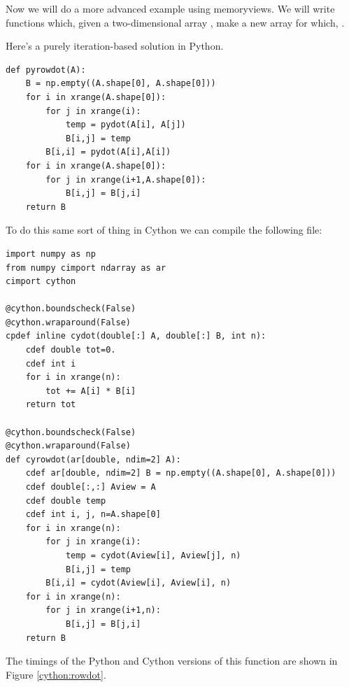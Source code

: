 Now we will do a more advanced example using memoryviews.
We will write functions which, given a two-dimensional array , make a new array  for which, .

Here's a purely iteration-based solution in Python.
\begin{lstlisting}
def pyrowdot(A):
    B = np.empty((A.shape[0], A.shape[0]))
    for i in xrange(A.shape[0]):
        for j in xrange(i):
            temp = pydot(A[i], A[j])
            B[i,j] = temp
        B[i,i] = pydot(A[i],A[i])
    for i in xrange(A.shape[0]):
        for j in xrange(i+1,A.shape[0]):
            B[i,j] = B[j,i]
    return B
\end{lstlisting}

To do this same sort of thing in Cython we can compile the following file:

\begin{lstlisting}
import numpy as np
from numpy cimport ndarray as ar
cimport cython

@cython.boundscheck(False)
@cython.wraparound(False)
cpdef inline cydot(double[:] A, double[:] B, int n):
    cdef double tot=0.
    cdef int i
    for i in xrange(n):
        tot += A[i] * B[i]
    return tot

@cython.boundscheck(False)
@cython.wraparound(False)
def cyrowdot(ar[double, ndim=2] A):
    cdef ar[double, ndim=2] B = np.empty((A.shape[0], A.shape[0]))
    cdef double[:,:] Aview = A
    cdef double temp
    cdef int i, j, n=A.shape[0]
    for i in xrange(n):
        for j in xrange(i):
            temp = cydot(Aview[i], Aview[j], n)
            B[i,j] = temp
        B[i,i] = cydot(Aview[i], Aview[i], n)
    for i in xrange(n):
        for j in xrange(i+1,n):
            B[i,j] = B[j,i]
    return B
\end{lstlisting}

The timings of the Python and Cython versions of this function are shown in Figure \ref{cython:rowdot}.

